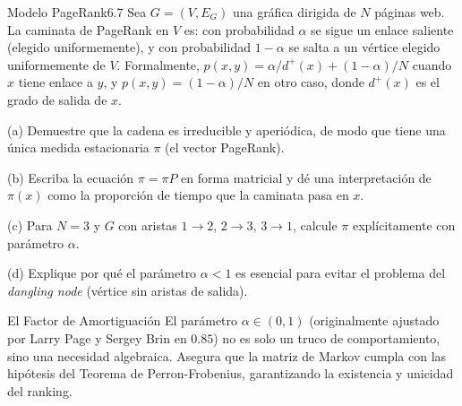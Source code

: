 \documentclass[10pt,a4paper]{article}
\begin{document}
\begin{ejercicio}{Modelo PageRank}{6.7}
    Sea $G = (V,E_G)$ una gráfica dirigida de $N$ páginas web. La caminata de PageRank en $V$ es: con probabilidad $\alpha$ se sigue un enlace saliente (elegido uniformemente), y con probabilidad $1 - \alpha$ se salta a un vértice elegido uniformemente de $V$. Formalmente, $p(x,y) = \alpha/d^+(x) + (1 - \alpha)/N$ cuando $x$ tiene enlace a $y$, y $p(x,y) = (1 - \alpha)/N$ en otro caso, donde $d^+(x)$ es el grado de salida de $x$.
    
    (a) Demuestre que la cadena es irreducible y aperiódica, de modo que tiene una única medida estacionaria $\pi$ (el vector PageRank).
    
    (b) Escriba la ecuación $\pi = \pi P$ en forma matricial y dé una interpretación de $\pi(x)$ como la proporción de tiempo que la caminata pasa en $x$.
    
    (c) Para $N = 3$ y $G$ con aristas $1 \to 2$, $2 \to 3$, $3 \to 1$, calcule $\pi$ explícitamente con parámetro $\alpha$.
    
    (d) Explique por qué el parámetro $\alpha < 1$ es esencial para evitar el problema del \textit{dangling node} (vértice sin aristas de salida).
\end{ejercicio}

\vspace{2mm}

\begin{nota}{El Factor de Amortiguación}
    El parámetro $\alpha \in (0, 1)$ (originalmente ajustado por Larry Page y Sergey Brin en $0.85$) no es solo un truco de comportamiento, sino una necesidad algebraica. Asegura que la matriz de Markov cumpla con las hipótesis del Teorema de Perron-Frobenius, garantizando la existencia y unicidad del ranking.
\end{nota}
\end{document}

